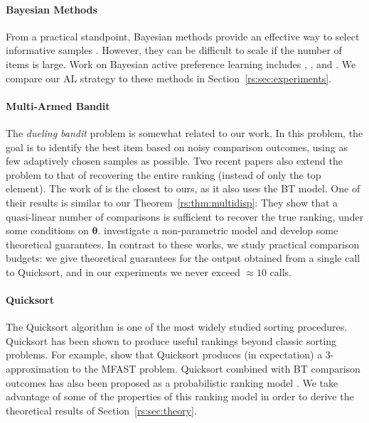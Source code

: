 \paragraph{Bayesian Methods}
From a practical standpoint, Bayesian methods provide an effective way to select informative samples \citep{mackay1992bayesian}.
However, they can be difficult to scale if the number of items is large.
Work on Bayesian active preference learning includes
\citet{chu2005extensions}, \citet{houlsby2012collaborative}, \citet{salimans2012collaborative} and \citet{chen2013pairwise}.
We compare our AL strategy to these methods in Section~\ref{rs:sec:experiments}.

\paragraph{Multi-Armed Bandit}
The \emph{dueling bandit} problem \citep{yue2009karmed} is somewhat related to our work.
In this problem, the goal is to identify the best item based on noisy comparison outcomes, using as few adaptively chosen samples as possible.
Two recent papers also extend the problem to that of recovering the entire ranking (instead of only the top element).
The work of \citet{szorenyi2015online} is the closest to ours, as it also uses the BT model.
One of their results is similar to our Theorem~\ref{rs:thm:multidisp}: They show that a quasi-linear number of comparisons is sufficient to recover the true ranking, under some conditions on $\bm{\theta}$.
\citet{heckel2016active} investigate a non-parametric model and develop some theoretical guarantees.
In contrast to these works, we study practical comparison budgets: we give theoretical guarantees for the output obtained from a single call to Quicksort, and in our experiments we never exceed $\approx 10$ calls.

\paragraph{Quicksort}
The Quicksort algorithm \citep{hoare1962quicksort} is one of the most widely studied sorting procedures.
Quicksort has been shown to produce useful rankings beyond classic sorting problems.
For example, \citet{ailon2008aggregating} show that Quicksort produces (in expectation) a $3$-approximation to the MFAST problem.
Quicksort combined with BT comparison outcomes has also been proposed as a probabilistic ranking model \citep{ailon2008reconciling}.
We take advantage of some of the properties of this ranking model in order to derive the theoretical results of Section~\ref{rs:sec:theory}.
